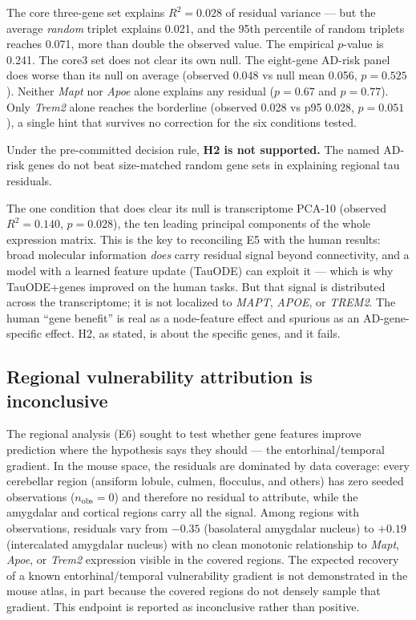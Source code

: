 \documentclass{article}
\begin{document}
The core three-gene set explains $R^2 = 0.028$ of residual variance --- but the average \textit{random} triplet explains 0.021, and the 95th percentile of random triplets reaches 0.071, more than double the observed value. The empirical $p$-value is 0.241. The core3 set does not clear its own null. The eight-gene AD-risk panel does worse than its null on average (observed 0.048 vs null mean 0.056, $p = 0.525$). Neither \textit{Mapt} nor \textit{Apoe} alone explains any residual ($p = 0.67$ and $p = 0.77$). Only \textit{Trem2} alone reaches the borderline (observed 0.028 vs p95 0.028, $p = 0.051$), a single hint that survives no correction for the six conditions tested.

Under the pre-committed decision rule, \textbf{H2 is not supported.} The named AD-risk genes do not beat size-matched random gene sets in explaining regional tau residuals.

The one condition that does clear its null is transcriptome PCA-10 (observed $R^2 = 0.140$, $p = 0.028$), the ten leading principal components of the whole expression matrix. This is the key to reconciling E5 with the human results: broad molecular information \textit{does} carry residual signal beyond connectivity, and a model with a learned feature update (TauODE) can exploit it --- which is why TauODE+genes improved on the human tasks. But that signal is distributed across the transcriptome; it is not localized to \textit{MAPT}, \textit{APOE}, or \textit{TREM2}. The human ``gene benefit'' is real as a node-feature effect and spurious as an AD-gene-specific effect. H2, as stated, is about the specific genes, and it fails.

\subsection{Regional vulnerability attribution is inconclusive}

The regional analysis (E6) sought to test whether gene features improve prediction where the hypothesis says they should --- the entorhinal/temporal gradient. In the mouse space, the residuals are dominated by data coverage: every cerebellar region (ansiform lobule, culmen, flocculus, and others) has zero seeded observations ($n_{\text{obs}} = 0$) and therefore no residual to attribute, while the amygdalar and cortical regions carry all the signal. Among regions with observations, residuals vary from $-0.35$ (basolateral amygdalar nucleus) to $+0.19$ (intercalated amygdalar nucleus) with no clean monotonic relationship to \textit{Mapt}, \textit{Apoe}, or \textit{Trem2} expression visible in the covered regions. The expected recovery of a known entorhinal/temporal vulnerability gradient is not demonstrated in the mouse atlas, in part because the covered regions do not densely sample that gradient. This endpoint is reported as inconclusive rather than positive.
\end{document}
